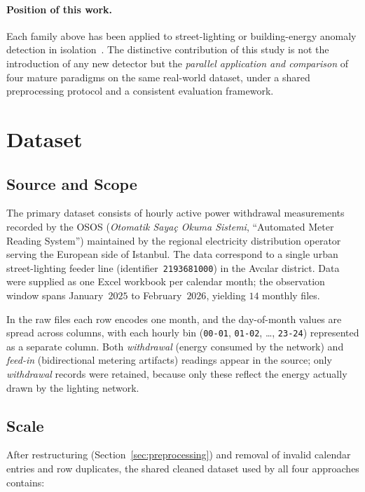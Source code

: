 \documentclass[11pt]{article}
\begin{document}
\paragraph{Position of this work.}
Each family above has been applied to street-lighting or building-energy anomaly detection in isolation~\cite{nespoli2024street,ptacek2022road,himeur2021survey,wang2020review}. The distinctive contribution of this study is not the introduction of any new detector but the \emph{parallel application and comparison} of four mature paradigms on the same real-world dataset, under a shared preprocessing protocol and a consistent evaluation framework.

\section{Dataset}\label{sec:dataset}

\subsection{Source and Scope}
The primary dataset consists of hourly active power withdrawal measurements recorded by the OSOS (\emph{Otomatik Say{a}{\c c} Okuma Sistemi}, ``Automated Meter Reading System'') maintained by the regional electricity distribution operator serving the European side of Istanbul. The data correspond to a single urban street-lighting feeder line (identifier~\texttt{2193681000}) in the Avc{\i}lar district. Data were supplied as one Excel workbook per calendar month; the observation window spans January~$2025$ to February~$2026$, yielding $14$ monthly files.

In the raw files each row encodes one month, and the day-of-month values are spread across columns, with each hourly bin (\texttt{00-01}, \texttt{01-02}, \ldots, \texttt{23-24}) represented as a separate column. Both \emph{withdrawal} (energy consumed by the network) and \emph{feed-in} (bidirectional metering artifacts) readings appear in the source; only \emph{withdrawal} records were retained, because only these reflect the energy actually drawn by the lighting network.

\subsection{Scale}
After restructuring (Section~\ref{sec:preprocessing}) and removal of invalid calendar entries and row duplicates, the shared cleaned dataset used by all four approaches contains:
\end{document}
